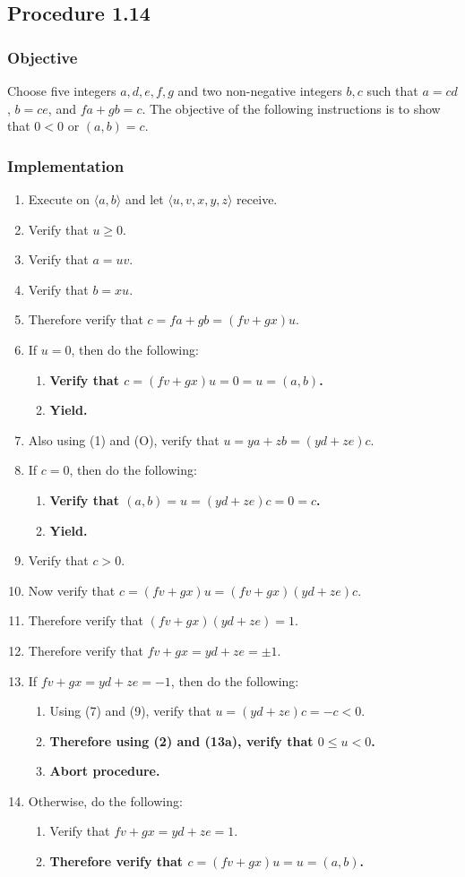 \documentclass[twocolumn]{article}
\newcommand{\procedure}[2][]{\subsection*{Procedure #2 \ifthenelse{\equal{#1}{}}{}{(#1)}}\label{sec:procedure #2}}
\newcommand{\objective}{\subsubsection*{Objective}}
\newcommand{\implementation}{\subsubsection*{Implementation}}
\newcommand{\procedurehr}[2][]{\hyperref[sec:procedure #2]{\ifthenelse{\equal{#1}{}}{procedure #2}{#1}}}
\begin{document}
		\procedure{1.14}
			\objective
				Choose five integers $a,d,e,f,g$ and two non-negative integers $b,c$ such that $a=cd$, $b=ce$, and $fa+gb=c$. The objective of the following instructions is to show that $0<0$ or $(a,b)=c$.
			\implementation
				\begin{enumerate}
					\item Execute \procedurehr{1.09} on $\langle a,b\rangle$ and let $\langle u,v,x,y,z\rangle$ receive.
					\item Verify that $u\ge 0$.
					\item Verify that $a=uv$.
					\item Verify that $b=xu$.
					\item Therefore verify that $c=fa+gb=(fv+gx)u$.
					\item If $u=0$, then do the following:
					\begin{enumerate}
						\item \textbf{Verify that $c=(fv+gx)u=0=u=(a,b)$.}
						\item \textbf{Yield.}
					\end{enumerate}
					\item Also using (1) and (O), verify that $u=ya+zb=(yd+ze)c$.
					\item If $c=0$, then do the following:
					\begin{enumerate}
						\item \textbf{Verify that $(a,b)=u=(yd+ze)c=0=c$.}
						\item \textbf{Yield.}
					\end{enumerate}
					\item Verify that $c>0$.
					\item Now verify that $c=(fv+gx)u=(fv+gx)(yd+ze)c$.
					\item Therefore verify that $(fv+gx)(yd+ze)=1$.
					\item Therefore verify that $fv+gx=yd+ze=\pm 1$.
					\item If $fv+gx=yd+ze=-1$, then do the following:
					\begin{enumerate}
						\item Using (7) and (9), verify that $u=(yd+ze)c=-c<0$.
						\item \textbf{Therefore using (2) and (13a), verify that $0\le u<0$.}
						\item \textbf{Abort procedure.}
					\end{enumerate}
					\item Otherwise, do the following:
					\begin{enumerate}
						\item Verify that $fv+gx=yd+ze=1$.
						\item \textbf{Therefore verify that $c=(fv+gx)u=u=(a,b)$.}
					\end{enumerate}
				\end{enumerate}
\end{document}
